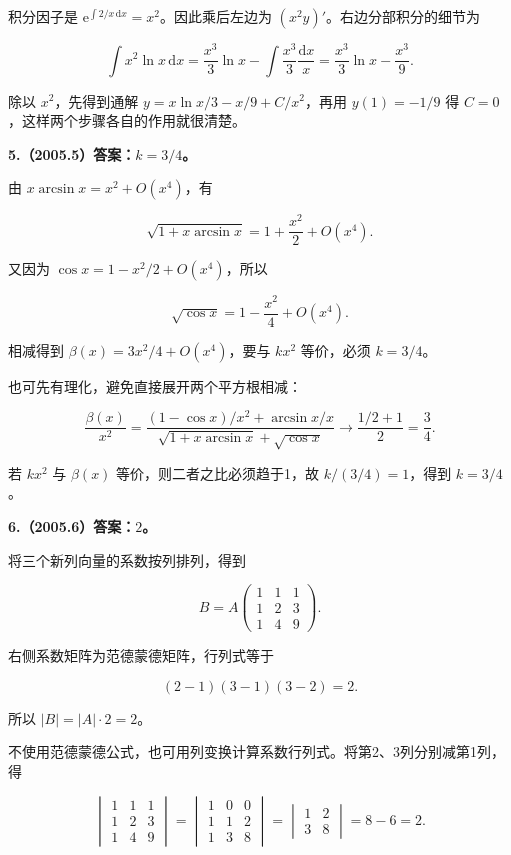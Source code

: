 \documentclass[UTF8,11pt,fontset=windows]{ctexart}
\begin{document}
积分因子是 $\mathrm e^{\int 2/x\,\mathrm dx}=x^2$。因此乘后左边为 $(x^2y)'$。右边分部积分的细节为

$$
\int x^2\ln x\,\mathrm dx
=\frac{x^3}3\ln x-\int\frac{x^3}3\frac{\mathrm dx}{x}
=\frac{x^3}3\ln x-\frac{x^3}9.
$$

除以 $x^2$，先得到通解 $y=x\ln x/3-x/9+C/x^2$，再用 $y(1)=-1/9$ 得 $C=0$，这样两个步骤各自的作用就很清楚。

\clearpage

\textbf{5.（2005.5）答案：$k=3/4$。}

由 $x\arcsin x=x^2+O(x^4)$，有

$$
\sqrt{1+x\arcsin x}=1+\frac{x^2}{2}+O(x^4).
$$

又因为 $\cos x=1-x^2/2+O(x^4)$，所以

$$
\sqrt{\cos x}=1-\frac{x^2}{4}+O(x^4).
$$

相减得到 $\beta(x)=3x^2/4+O(x^4)$，要与 $kx^2$ 等价，必须 $k=3/4$。

也可先有理化，避免直接展开两个平方根相减：

$$
\frac{\beta(x)}{x^2}
=\frac{(1-\cos x)/x^2+\arcsin x/x}
{\sqrt{1+x\arcsin x}+\sqrt{\cos x}}
\longrightarrow\frac{1/2+1}{2}=\frac34.
$$

若 $kx^2$ 与 $\beta(x)$ 等价，则二者之比必须趋于1，故 $k/(3/4)=1$，得到 $k=3/4$。

\clearpage

\textbf{6.（2005.6）答案：$2$。}

将三个新列向量的系数按列排列，得到

$$
B=A\begin{pmatrix}1&1&1\\1&2&3\\1&4&9\end{pmatrix}.
$$

右侧系数矩阵为范德蒙德矩阵，行列式等于

$$
(2-1)(3-1)(3-2)=2.
$$

所以 $|B|=|A|\cdot2=2$。

不使用范德蒙德公式，也可用列变换计算系数行列式。将第2、3列分别减第1列，得

$$
\begin{vmatrix}1&1&1\\1&2&3\\1&4&9\end{vmatrix}
=\begin{vmatrix}1&0&0\\1&1&2\\1&3&8\end{vmatrix}
=\begin{vmatrix}1&2\\3&8\end{vmatrix}=8-6=2.
$$
\end{document}
